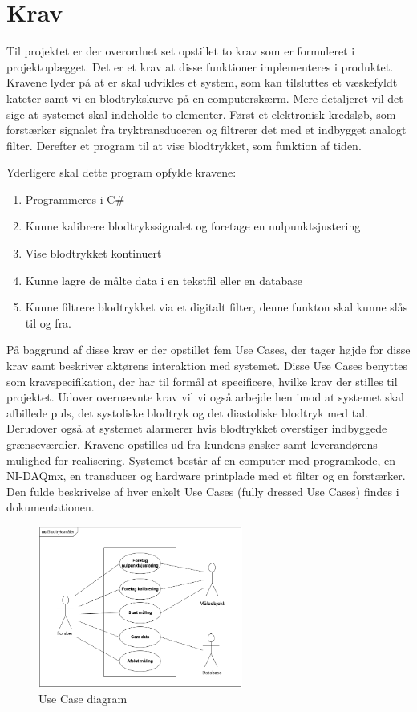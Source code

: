 \chapter{Krav}
Til projektet er der overordnet set opstillet to krav som er formuleret i projektoplægget. Det er et krav at disse funktioner implementeres i produktet. Kravene lyder på at er skal udvikles et system, som kan tilsluttes et væskefyldt kateter samt vi en blodtrykskurve på en computerskærm. Mere detaljeret vil det sige at systemet skal indeholde to elementer. Først et elektronisk kredsløb, som forstærker signalet fra tryktransduceren og filtrerer det med et indbygget analogt filter. Derefter et program til at vise blodtrykket, som funktion af tiden.

Yderligere skal dette program opfylde kravene:
\begin{enumerate}
\item Programmeres i C\#
\item Kunne kalibrere blodtrykssignalet og foretage en nulpunktsjustering
\item Vise blodtrykket kontinuert
\item Kunne lagre de målte data i en tekstfil eller en database
\item Kunne filtrere blodtrykket via et digitalt filter, denne funkton skal kunne slås til og fra.
\end{enumerate}

På baggrund af disse krav er der opstillet fem Use Cases, der tager højde for disse krav samt beskriver aktørens interaktion med systemet. Disse Use Cases benyttes som kravspecifikation, der har til formål at specificere, hvilke krav der stilles til projektet. Udover overnævnte krav vil vi også arbejde hen imod at systemet skal afbillede puls, det systoliske blodtryk og det diastoliske blodtryk med tal. Derudover også at systemet alarmerer hvis blodtrykket overstiger indbyggede grænseværdier.
Kravene opstilles ud fra kundens ønsker samt leverandørens mulighed for realisering. Systemet består af en computer med programkode, en NI-DAQmx, en transducer og hardware printplade med et filter og en forstærker. Den fulde beskrivelse af hver enkelt Use Cases (fully dressed Use Cases) findes i dokumentationen. 

\begin{figure}[htb]
	\centering
	\includegraphics[width=0.6\textwidth]{Figurer/UseCasediagram}
	\caption{Use Case diagram}
\end{figure}

